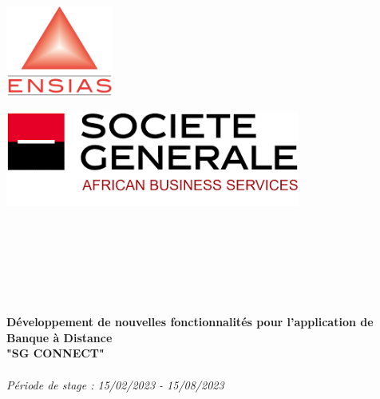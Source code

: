 \thispagestyle{empty}

\begin{titlepage}
    \begin{center}
    
    \begin{minipage}[C]{0.5\textwidth}
    \raggedright
    \includegraphics[height=3cm]{images/logosHeaders/ensias.png}
    \end{minipage}%
    \begin{minipage}[C]{0.5\textwidth}
    \raggedleft
    \includegraphics[height=3.1cm]{images/logos/SG_ABS.png}
    \end{minipage}
    
    \textsc{\Large }\\[1cm]
     \\[.2cm]
     \\ [.2cm]
    \\[.2cm]
    \\[.5cm]
    
    \HRule \\[0.4cm]
    
    {\huge \bfseries 
    Développement de nouvelles fonctionnalités pour l'application de Banque à Distance\\ "SG CONNECT"\\[0.4cm] }
    \HRule \\
    \emph{Période de stage : 15/02/2023 - 15/08/2023}\\[3cm]
    
    

\end{center}
\end{titlepage}
